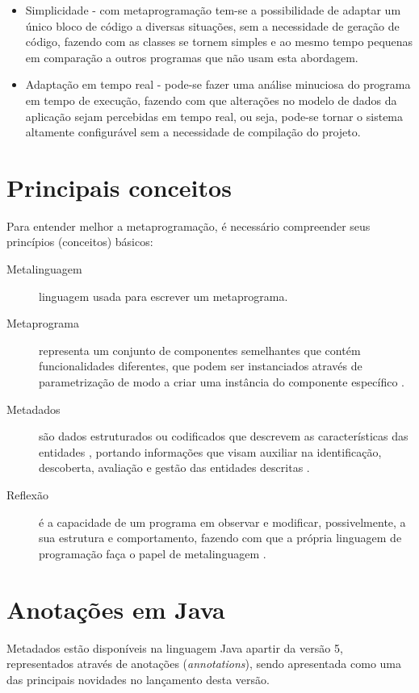 \documentclass[tc,openright]{iiufrgs}
\begin{document}
\begin{itemize}
\item Simplicidade - com metaprogramação tem-se a possibilidade de adaptar um único bloco de código a diversas situações, sem a necessidade de geração de código, fazendo com as classes se tornem simples e ao mesmo tempo pequenas em comparação a outros programas que não usam esta abordagem.
\item Adaptação em tempo real - pode-se fazer uma análise minuciosa do programa em tempo de execução, fazendo com que alterações no modelo de dados da aplicação sejam percebidas em tempo real, ou seja, pode-se tornar o sistema altamente configurável sem a necessidade de compilação do projeto.
\end{itemize}

\section{Principais conceitos}
Para entender melhor a metaprogramação, é necessário compreender seus princípios (conceitos) básicos:

\begin{description}
\item [Metalinguagem]  linguagem usada para escrever um metaprograma.
\item [Metaprograma ] representa um conjunto de componentes semelhantes que contém funcionalidades diferentes, que podem ser instanciados através de parametrização de modo a criar uma instância do componente específico \cite{damavsevivcius2008taxonomy}.
\item [Metadados] são dados estruturados ou codificados que descrevem as características das entidades , portando informações que visam auxiliar na identificação,  descoberta, avaliação e gestão das entidades descritas \cite{american1999task}.
\item [Reflexão] é a capacidade de um programa em observar e modificar, possivelmente, a sua estrutura e comportamento, fazendo com que a própria linguagem de programação faça o papel de metalinguagem \cite{malenfant1996tutorial}.
\end{description}

\section{Anotações em Java}
Metadados estão disponíveis na linguagem Java apartir da versão 5,  representados através de anotações (\textit{annotations}), sendo apresentada como uma das principais novidades no lançamento desta versão.
\end{document}
